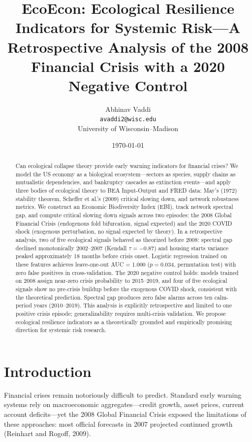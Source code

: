 \documentclass[12pt,a4paper]{article}
\title{\textbf{EcoEcon: Ecological Resilience Indicators for Systemic Risk---A Retrospective Analysis of the 2008 Financial Crisis with a 2020 Negative Control}}
\author{
    Abhinav Vaddi\\
    \texttt{avaddi2@wisc.edu}\\
    University of Wisconsin--Madison
}
\date{\today}
\begin{document}
\maketitle

\begin{abstract}
Can ecological collapse theory provide early warning indicators for financial crises?
We model the US economy as a biological ecosystem---sectors as species, supply chains
as mutualistic dependencies, and bankruptcy cascades as extinction events---and apply
three bodies of ecological theory to BEA Input-Output and FRED data: May's (1972)
stability theorem, Scheffer et al.'s (2009) critical slowing down, and network
robustness metrics. We construct an Economic Biodiversity Index (EBI), track network
spectral gap, and compute critical slowing down signals across two episodes: the 2008
Global Financial Crisis (endogenous fold bifurcation, signal expected) and the 2020
COVID shock (exogenous perturbation, no signal expected by theory). In a retrospective
analysis, two of five ecological signals behaved as theorized before 2008: spectral gap
declined monotonically 2002--2007 (Kendall $\tau = -0.87$) and housing starts variance
peaked approximately 18 months before crisis onset. Logistic regression trained on these
features achieves leave-one-out AUC = 1.000 ($p = 0.034$, permutation test) with zero
false positives in cross-validation. The 2020 negative control holds: models trained on
2008 assign near-zero crisis probability to 2015--2019, and four of five ecological
signals show no pre-crisis buildup before the exogenous COVID shock, consistent with
the theoretical prediction. Spectral gap produces zero false alarms across ten calm-period
years (2010--2019). This analysis is explicitly retrospective and limited to one positive
crisis episode; generalizability requires multi-crisis validation. We propose ecological
resilience indicators as a theoretically grounded and empirically promising direction for
systemic risk research.
\end{abstract}

\section{Introduction}

Financial crises remain notoriously difficult to predict. Standard early warning systems
rely on macroeconomic aggregates---credit growth, asset prices, current account
deficits---yet the 2008 Global Financial Crisis exposed the limitations of these
approaches: most official forecasts in 2007 projected continued growth (Reinhart and Rogoff, 2009).
\end{document}

